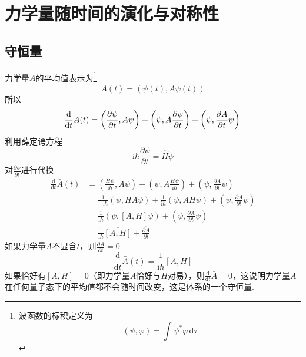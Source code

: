 \section{力学量随时间的演化与对称性}
\subsection{守恒量}
力学量$A$的平均值表示为\footnote{波函数的标积定义为$$\left(\psi, \varphi\right) = \int_{}^{}\psi^*\varphi \,\mathrm{d}\tau$$}
$$
    \bar{A}(t) = \left(\psi(t), A\psi(t)\right)
$$
所以
$$
    \frac{\mathrm{d}}{\mathrm{d}t}\bar{A}(t)
    =\left(\frac{\partial \psi}{\partial t}, A\psi\right) + \left(\psi, A\frac{\partial \psi}{\partial t}\right) + \left(\psi, \frac{\partial A}{\partial t}\psi\right) \\
$$
利用薛定谔方程
$$
    \mathrm{i}\hbar\frac{\partial \psi}{\partial t} = \hat{H}\psi
$$
对$\displaystyle \frac{\partial \psi}{\partial t}$进行代换
$$
    \begin{aligned}
        \frac{\mathrm{d}}{\mathrm{d}t}\bar{A}(t)
         & =\left(\frac{H\psi}{\mathrm{i}\hbar}, A\psi\right)+\left(\psi, A\frac{H\psi}{\mathrm{i}\hbar}\right) + \left(\psi, \frac{\partial A}{\partial t}\psi\right) \\
         & =\frac{1}{-\mathrm{i}\hbar}(\psi, HA\psi) + \frac{1}{\mathrm{i}\hbar}(\psi, AH\psi) + \left(\psi, \frac{\partial A}{\partial t}\psi\right)                  \\
         & =\frac{1}{\mathrm{i}\hbar}(\psi, [A,H]\psi) +  \left(\psi, \frac{\partial A}{\partial t}\psi\right)                                                         \\
         & =\frac{1}{\mathrm{i}\hbar}\overline{[A,H]}+\frac{\overline{\partial A}}{\partial t}
    \end{aligned}
$$
如果力学量$A$不显含$t$，则$\displaystyle \frac{\partial A}{\partial t}=0$
\begin{equation}
    \frac{\mathrm{d}}{\mathrm{d}t}\bar{A}(t)=\frac{1}{\mathrm{i}\hbar}\overline{[A,H]}
\end{equation}
如果恰好有$[A, H]=0$（即力学量$A$恰好与$H$对易），则$\displaystyle \frac{\mathrm{d}}{\mathrm{d}t}\bar{A}=0$，这说明力学量$A$在任何量子态下的平均值都不会随时间改变，这是体系的一个守恒量.


